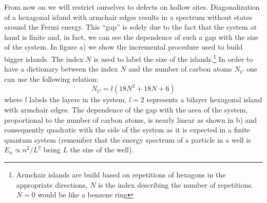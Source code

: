 From now on we will restrict ourselves to defects on hollow sites.
Diagonalization of a hexagonal island with armchair edges results in a spectrum without states around the Fermi energy. This ``gap'' is solely due to the fact that the system at hand is finite and, in fact, we can see the dependence of such a gap with the size of the system. In figure a) we show the incremental procedure used to build bigger islands. The index $N$ is used to label the size of the islands.\footnote{Armchair islands are build based on repetitions of hexagons in the appropriate directions, $N$ is the index describing the number of repetitions. $N=0$ would be like a benzene ring} In order to have a dictionary between the index $N$ and the number of carbon atoms $N_C$ one can use the following relation:
\begin{equation}
   N_C = l\left(18N^2+18N+6\right)
\label{Nc}
\end{equation}
where $l$ labels the layers in the system, $l=2$ represents a bilayer hexagonal island with armchair edges.
The dependence of the gap with the area of the system, proportional to the number of carbon atoms, is nearly linear as shown in b) and consequently quadratic with the side of the system as it is expected in a finite quantum system (remember that the energy spectrum of a particle in a well is $E_n\propto n^2/L^2$ being $L$ the size of the well).

